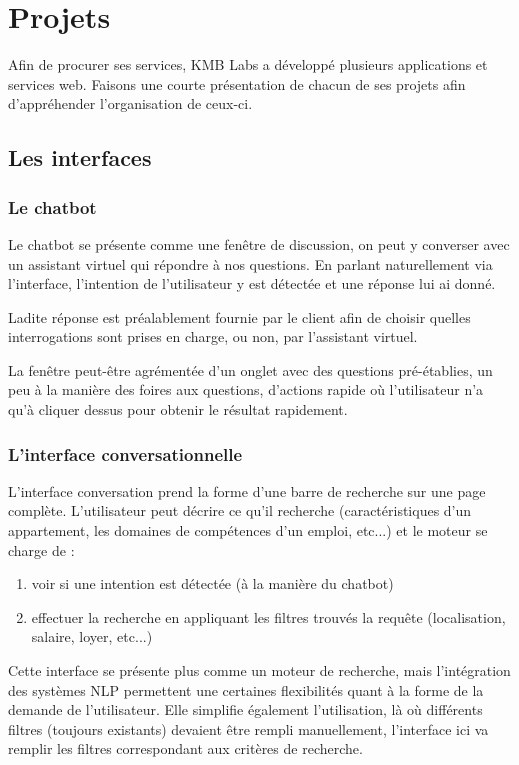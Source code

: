 \documentclass[12pt,a4paper,twoside]{scrreprt}
\begin{document}
\chapter{Projets}
Afin de procurer ses services, KMB Labs a développé plusieurs applications et services web. Faisons une courte présentation de chacun de ses projets afin d'appréhender l'organisation de ceux-ci.

\section{Les interfaces}
\subsection{Le chatbot}

Le chatbot se présente comme une fenêtre de discussion, on peut y converser avec un assistant virtuel qui répondre à nos questions. En parlant naturellement via l'interface, l'intention de l'utilisateur y est détectée et une réponse lui ai donné.

Ladite réponse est préalablement fournie par le client afin de choisir quelles interrogations sont prises en charge, ou non, par l'assistant virtuel.

La fenêtre peut-être agrémentée d'un onglet avec des questions pré-établies, un peu à la manière des foires aux questions, d'actions rapide où l'utilisateur n'a qu'à cliquer dessus pour obtenir le résultat rapidement.

\subsection{L'interface conversationnelle}
L'interface conversation prend la forme d'une barre de recherche sur une page complète. L'utilisateur peut décrire ce qu'il recherche (caractéristiques d'un appartement, les domaines de compétences d'un emploi, etc...) et le moteur se charge de :
\begin{enumerate}
	\item voir si une intention est détectée (à la manière du chatbot)
	\item effectuer la recherche en appliquant les filtres trouvés la requête (localisation, salaire, loyer, etc...)
\end{enumerate}

Cette interface se présente plus comme un moteur de recherche, mais l'intégration des systèmes NLP permettent une certaines flexibilités quant à la forme de la demande de l'utilisateur. Elle simplifie également l'utilisation, là où différents filtres (toujours existants) devaient être rempli manuellement, l'interface ici va remplir les filtres correspondant aux critères de recherche.
\end{document}
